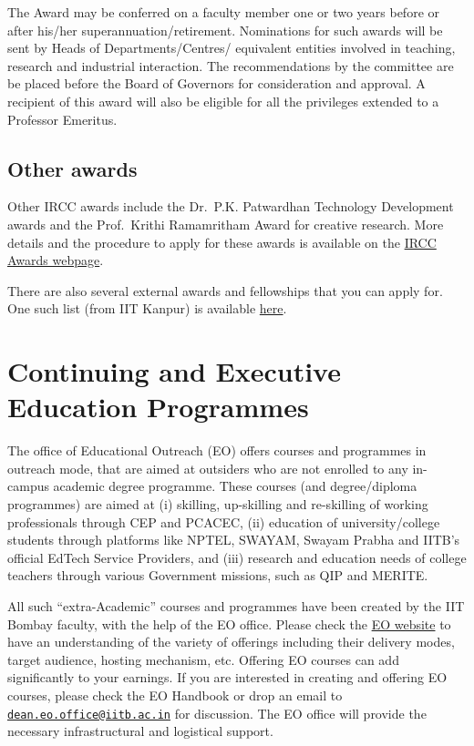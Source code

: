 \documentclass[
  10pt,
  a5paper,
  10pt,
  openany]{amsbook}
\begin{document}
The Award may be conferred on a faculty member one or two years before
or after his/her superannuation/retirement. Nominations for such awards
will be sent by Heads of Departments/Centres/ equivalent entities
involved in teaching, research and industrial interaction. The
recommendations by the committee are be placed before the Board of
Governors for consideration and approval. A recipient of this award will
also be eligible for all the privileges extended to a Professor
Emeritus.

\section{Other awards}\label{other-awards}

Other IRCC awards include the Dr.~P.K. Patwardhan Technology Development
awards and the Prof.~Krithi Ramamritham Award for creative research.
More details and the procedure to apply for these awards is available on
the \href{https://rnd.iitb.ac.in/awards}{IRCC Awards webpage}.

There are also several external awards and fellowships that you can
apply for. One such list (from IIT Kanpur) is available
\href{https://www.iitk.ac.in/dofa/awards-honors}{here}.

\chapter{Continuing and Executive Education Programmes}\label{sec:cep}

The office of Educational Outreach (EO) offers courses and programmes in
outreach mode, that are aimed at outsiders who are not enrolled to any
in-campus academic degree programme. These courses (and degree/diploma
programmes) are aimed at (i) skilling, up-skilling and re-skilling of
working professionals through CEP and PCACEC, (ii) education of
university/college students through platforms like NPTEL, SWAYAM, Swayam
Prabha and IITB's official EdTech Service Providers, and (iii) research
and education needs of college teachers through various Government
missions, such as QIP and MERITE.

All such ``extra-Academic'' courses and programmes have been created by
the IIT Bombay faculty, with the help of the EO office. Please check the
\href{https://www.cep.iitb.ac.in/}{EO website} to have an understanding
of the variety of offerings including their delivery modes, target
audience, hosting mechanism, etc. Offering EO courses can add
significantly to your earnings. If you are interested in creating and
offering EO courses, please check the EO Handbook or drop an email to
\href{mailto:dean.eo.office@iitb.ac.in}{\nolinkurl{dean.eo.office@iitb.ac.in}}
for discussion. The EO office will provide the necessary infrastructural
and logistical support.
\end{document}
